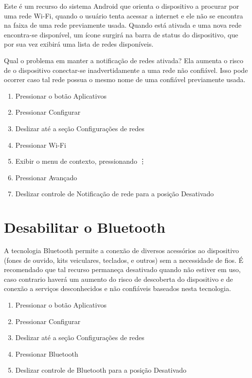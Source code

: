 Este \'e um recurso do sistema Android que orienta o dispositivo a procurar por uma rede Wi-Fi, quando o usu\'ario tenta acessar a internet e ele n\~ao se encontra na faixa de uma rede previamente usada. Quando est\'a ativada e uma nova rede encontra-se dispon\'ivel, um \'icone surgir\'a na barra de status do dispositivo, que por sua vez exibir\'a uma lista de redes dispon\'iveis.

Qual o problema em manter a notifica\c c\~ao de redes ativada? Ela aumenta o risco de o dispositivo conectar-se inadvertidamente a uma rede n\~ao confi\'avel. Isso pode ocorrer caso tal rede possua o mesmo nome de uma confi\'avel previamente usada.

\begin{enumerate}
\item Pressionar o bot\~ao Aplicativos
\item Pressionar Configurar
\item Deslizar at\'e a se\c c\~ao Configura\c c\~oes de redes
\item Pressionar Wi-Fi
\item Exibir o menu de contexto, pressionando \vdots
\item Pressionar Avan\c cado
\item Deslizar controle de Notifica\c c\~ao de rede para a posi\c c\~ao Desativado
\end{enumerate}

\section{Desabilitar o Bluetooth}

A tecnologia Bluetooth permite a conex\~ao de diversos acess\'orios ao dispositivo (fones de ouvido, kits veiculares, teclados, e outros) sem a necessidade de fios. \'E recomendado que tal recurso permane\c ca desativado quando n\~ao estiver em uso, caso contrario haver\'a um aumento do risco de descoberta do dispositivo e de conex\~ao a servi\c cos desconhecidos e n\~ao confi\'aveis baseados nesta tecnologia.

\begin{enumerate}
\item Pressionar o bot\~ao Aplicativos
\item Pressionar Configurar
\item Deslizar at\'e a se\c c\~ao Configura\c c\~oes de redes
\item Pressionar Bluetooth
\item Deslizar controle de Bluetooth para a posi\c c\~ao Desativado
\end{enumerate}

